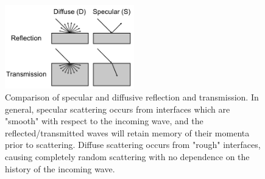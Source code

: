 \begin{figure}
\begin{center}
\includegraphics[width=0.5\textwidth]{./Chapter1/nanoscale2.png}
\caption[Comparison of specular and diffusive scattering processes.]{Comparison of specular and diffusive reflection and transmission. In general, specular scattering occurs from interfaces which are "smooth" with respect to the incoming wave, and the reflected/transmitted waves will retain memory of their momenta prior to scattering. Diffuse scattering occurs from "rough" interfaces, causing completely random scattering with no dependence on the history of the incoming wave.}
\label{f:ch1nano2}
\end{center}
\end{figure}

